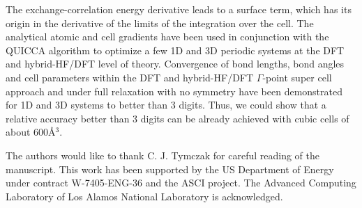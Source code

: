 \documentclass[pra,twocolumn,twocolumngrid,superbib]{revtex4} %
\begin{document}
The exchange-correlation energy derivative leads to a surface term, which has its
origin in the derivative of the limits of the integration over the cell.
The analytical atomic and cell gradients have been used
in conjunction with the QUICCA algorithm to optimize a few 1D and 3D periodic systems at
the DFT and hybrid-HF/DFT level of theory.
Convergence of bond lengths, bond angles and
cell parameters within the DFT and hybrid-HF/DFT $\Gamma$-point
super cell approach and under full relaxation with no symmetry
have been demonstrated for 1D and 3D systems to better than 3 digits.
Thus, we could show that a relative accuracy better
than 3 digits can be already achieved with cubic cells of about $600$\AA$^3$.\\




\begin{acknowledgments}
The authors would like to thank C. J. Tymczak
for careful reading of the manuscript. 
This work has been supported by the US Department of Energy
under contract W-7405-ENG-36 and the ASCI project.
The Advanced Computing Laboratory of Los Alamos National 
Laboratory is acknowledged.
\end{acknowledgments}  

\newpage



\end{document}
